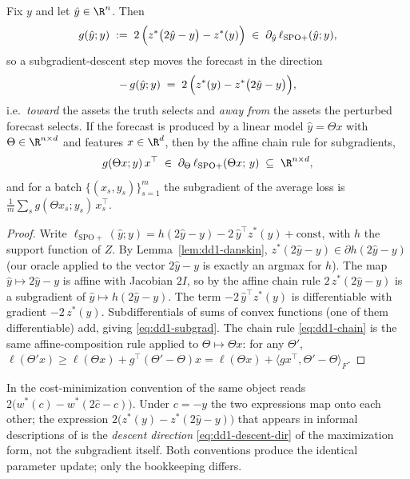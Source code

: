 \begin{proposition}
\label{prop:dd1-spoplus-grad}
Fix $y$ and let $\hat{y} \in \R^n$. Then
\begin{equation}
\label{eq:dd1-subgrad}
g(\hat{y}; y) \;:=\; 2\,\Bigl( z^*\bigl(2\hat{y} - y\bigr) - z^*(y) \Bigr)
\;\in\; \partial_{\hat{y}}\, \ell_{\mathrm{SPO+}}(\hat{y}; y),
\end{equation}
so a subgradient-descent step moves the forecast in the direction
\begin{equation}
\label{eq:dd1-descent-dir}
-\,g(\hat{y}; y) \;=\; 2\,\Bigl( z^*(y) - z^*\bigl(2\hat{y} - y\bigr) \Bigr),
\end{equation}
i.e.\ \emph{toward} the assets the truth selects and \emph{away from} the
assets the perturbed forecast selects. If the forecast is produced by a linear
model $\hat{y} = \Theta x$ with $\Theta \in \R^{n \times d}$ and features
$x \in \R^d$, then by the affine chain rule for subgradients,
\begin{equation}
\label{eq:dd1-chain}
g(\Theta x; y)\, x^\top \;\in\; \partial_{\Theta}\,
\ell_{\mathrm{SPO+}}(\Theta x;\, y) \;\subseteq\; \R^{n \times d},
\end{equation}
and for a batch $\{(x_s, y_s)\}_{s=1}^m$ the subgradient of the average loss
is $\frac{1}{m} \sum_s g(\Theta x_s; y_s)\, x_s^\top$.
\end{proposition}

\begin{proof}
Write $\ell_{\mathrm{SPO+}}(\hat{y}; y) = h(2\hat{y} - y) - 2\,\hat{y}^\top
z^*(y) + \text{const}$, with $h$ the support function of $Z$. By
Lemma~\ref{lem:dd1-danskin}, $z^*(2\hat{y} - y) \in \partial h(2\hat{y} - y)$
(our oracle applied to the vector $2\hat{y} - y$ is exactly an argmax for
$h$). The map $\hat{y} \mapsto 2\hat{y} - y$ is affine with Jacobian $2 I$, so
by the affine chain rule $2\,z^*(2\hat{y} - y)$ is a subgradient of
$\hat{y} \mapsto h(2\hat{y} - y)$. The term $-2\,\hat{y}^\top z^*(y)$ is
differentiable with gradient $-2\,z^*(y)$. Subdifferentials of sums of convex
functions (one of them differentiable) add, giving \eqref{eq:dd1-subgrad}.
The chain rule \eqref{eq:dd1-chain} is the same affine-composition rule
applied to $\Theta \mapsto \Theta x$: for any $\Theta'$,
$\ell(\Theta' x) \ge \ell(\Theta x) + g^\top(\Theta' - \Theta)x
= \ell(\Theta x) + \langle g x^\top, \Theta' - \Theta\rangle_F$.
\end{proof}

\begin{remark}
\label{rem:dd1-sign}
In the cost-minimization convention of \cite{elmachtoub2022smart} the same
object reads $2\bigl(w^*(c) - w^*(2\hat{c} - c)\bigr)$. Under $c = -y$ the two
expressions map onto each other; the expression
$2\bigl(z^*(y) - z^*(2\hat{y} - y)\bigr)$ that appears in informal
descriptions of \nm{} is the \emph{descent direction}
\eqref{eq:dd1-descent-dir} of the maximization form, not the subgradient
itself. Both conventions produce the identical parameter update; only the
bookkeeping differs.
\end{remark}

